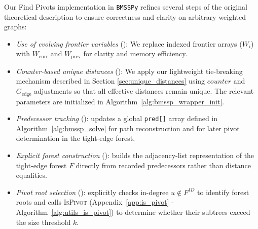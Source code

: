 \documentclass[ijoc,blindrev]{informs3} %
\begin{document}
Our Find Pivots implementation in \texttt{BMSSPy} refines several steps of the original theoretical description to ensure correctness and clarity on arbitrary weighted graphs:
\begin{itemize} 
    \item \textit{Use of evolving frontier variables} (): We replace indexed frontier arrays ($W_i$) with $W_{\mathrm{curr}}$ and $W_{\mathrm{prev}}$ for clarity and memory efficiency. 
    \item \textit{Counter-based unique distances} (): We apply our lightweight tie-breaking mechanism described in Section \ref{sec:unique_distances} using $counter$ and $G_{\text{edge}}$ adjustments so that all effective distances remain unique. The relevant parameters are initialized in Algorithm~\ref{alg:bmssp_wrapper_init}. 
    \item \textit{Predecessor tracking} (): updates a global \texttt{pred[]} array defined in Algorithm~\ref{alg:bmssp_solve} for path reconstruction and for later pivot determination in the tight-edge forest. 
    \item \textit{Explicit forest construction} (): builds the adjacency-list representation of the tight-edge forest $F$ directly from recorded predecessors rather than distance equalities. 
    \item \textit{Pivot root selection} (): explicitly checks in-degree $u \notin F^{ID}$ to identify forest roots and calls \textsc{IsPivot} ({\color{blue}Appendix~\ref{app:is_pivot} - Algorithm~\ref{alg:utils_is_pivot}}) to determine whether their subtrees exceed the size threshold $k$. 
\end{itemize}


\end{document}
